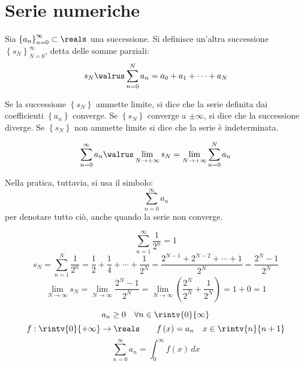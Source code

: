 \section{Serie numeriche}

\begin{definition}
  Sia $\left\{ a_n \right\}_{n=0}^\infty\subset\reals$ una successione. Si definisce un'altra successione $\left\{ s_N \right\}_{N=0}^\infty$, detta delle somme parziali:
  $$s_N\walrus \sum_{n=0}^Na_n=a_0+a_1+\cdots+a_N$$
  
  Se la successione $\left\{ s_N \right\}$ ammette limite, si dice che la serie definita dai coefficienti $\left\{ a_n \right\}$ converge. 
  Se $\left\{ s_N \right\}$ converge a $\pm\infty$, si dice che la successione diverge.  
  Se $\left\{ s_N \right\}$ non ammette limite si dice che la serie è indeterminata.
  
  $$\sum_{n=0}^\infty a_n\walrus\lim_{N\to+\infty}s_N=\lim_{N\to+\infty}\sum_{n=0}^Na_n$$
\end{definition}

Nella pratica, tuttavia, si usa il simbolo:
$$\sum_{n=0}^\infty a_n$$
per denotare tutto ciò, anche quando la serie non converge.

\begin{example}
  $$\sum_{n=1}^\infty\frac{1}{2^n}=1$$
  $$s_N=\sum_{n=1}^N\frac{1}{2^n}=\frac{1}{2}+\frac{1}{4}+\cdots+\frac{1}{2^N}=\frac{2^{N-1}+2^{N-2}+\cdots+1}{2^N}=\frac{2^N-1}{2^N}$$
  $$\lim_{N\to\infty}s_N=\lim_{N\to\infty}\frac{2^N-1}{2^N}=\lim_{N\to\infty}\left( \frac{2^N}{2^N}+\frac{1}{2^N} \right)=1+0=1$$
\end{example}

\begin{example}
  $$a_n\ge0\quad \forall n\in\rintv{0}{\infty}$$
  $$f:\rintv{0}{+\infty}\to\reals\qquad f\left( x \right)=a_n\quad x\in\rintv{n}{n+1}$$
  $$\sum_{n=0}^\infty a_n=\int_0^\infty f\left( x \right)\,dx$$
\end{example}

